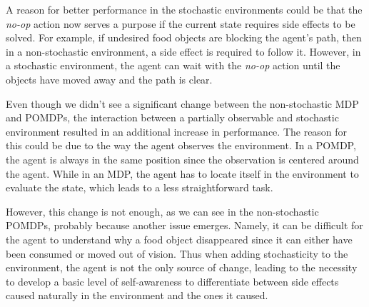 \documentclass[12pt,A4]{report}
\theoremstyle{definition}
\begin{document}
A reason for better performance in the stochastic environments could be that the \textit{no-op} action now serves a purpose if the current state requires side effects to be solved. For example, if undesired food objects are blocking the agent's path, then in a non-stochastic environment, a side effect is required to follow it. However, in a stochastic environment, the agent can wait with the \textit{no-op} action until the objects have moved away and the path is clear.

Even though we didn't see a significant change between the non-stochastic MDP and POMDPs, the interaction between a partially observable and stochastic environment resulted in an additional increase in performance. The reason for this could be due to the way the agent observes the environment. In a POMDP, the agent is always in the same position since the observation is centered around the agent. While in an MDP, the agent has to locate itself in the environment to evaluate the state, which leads to a less straightforward task. 

However, this change is not enough, as we can see in the non-stochastic POMDPs, probably because another issue emerges. Namely, it can be difficult for the agent to understand why a food object disappeared since it can either have been consumed or moved out of vision. Thus when adding stochasticity to the environment, the agent is not the only source of change, leading to the necessity to develop a basic level of self-awareness to differentiate between side effects caused naturally in the environment and the ones it caused.




\end{document}

